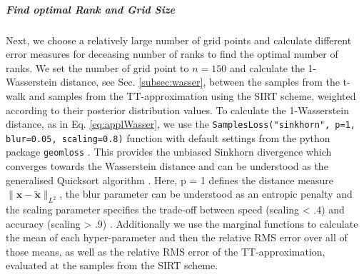 \subparagraph{Find optimal Rank and Grid Size}
Next, we choose a relatively large number of grid points and calculate different error measures for deceasing number of ranks to find the optimal number of ranks.
We set the number of grid point to $n = 150$ and calculate the 1-Wasserstein distance, see Sec. \ref{subsec:wasser}, between the samples from the t-walk and samples from the TT-approximation using the SIRT scheme, weighted according to their posterior distribution values.  
To calculate the 1-Wasserstein distance, as in Eq. \ref{eq:applWasser}, we use the \texttt{SamplesLoss("sinkhorn", p=1, blur=0.05, scaling=0.8)} function with default settings from the python package \texttt{geomloss} \cite{Wassersteinaccess}.
This provides the unbiased Sinkhorn divergence which converges towards the Wasserstein distance and can be understood as the generalised Quicksort algorithm \cite{feydy2020OT}.
Here, p = 1 defines the distance measure $\lVert \bm{x} -\tilde{\bm{x}} \rVert_{L^2}$, the blur parameter can be understood as an entropic penalty and the  scaling parameter specifies the trade-off between speed (scaling < .4) and accuracy (scaling > .9) \cite{Wassersteinaccess}.
Additionally we use the marginal functions to calculate the mean of each hyper-parameter and then the relative RMS error over all of those means, as well as the relative RMS error of the TT-approximation, evaluated at the samples from the SIRT scheme.


